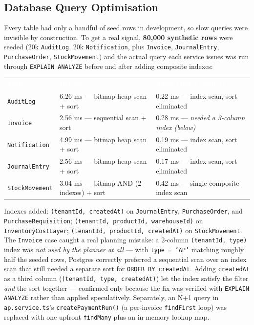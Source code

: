\documentclass[11pt,a4paper]{article}
\newcommand{\code}[1]{\texttt{\small #1}}
\begin{document}
\subsection{Database Query Optimisation}

Every table had only a handful of seed rows in development, so slow queries were
invisible by construction. To get a real signal, \textbf{80{,}000 synthetic rows} were
seeded (20k \code{AuditLog}, 20k \code{Notification}, plus \code{Invoice},
\code{JournalEntry}, \code{PurchaseOrder}, \code{StockMovement}) and the actual query
each service issues was run through \code{EXPLAIN ANALYZE} before and after adding
composite indexes:

\begin{table}[H]
\centering\small
\renewcommand{\arraystretch}{1.2}
\begin{tabularx}{\textwidth}{l X X}
\toprule
\rowcolor{amdoxnavy}
\textcolor{white}{\textbf{Table}} & \textcolor{white}{\textbf{Before}} & \textcolor{white}{\textbf{After (index added)}} \\
\code{AuditLog} & 6.26 ms --- bitmap heap scan + sort & 0.22 ms --- index scan, sort eliminated \\
\rowcolor{amdoxlight}
\code{Invoice} & 2.56 ms --- sequential scan + sort & 0.28 ms --- \emph{needed a 3-column index (below)} \\
\code{Notification} & 4.99 ms --- bitmap heap scan + sort & 0.19 ms --- index scan, sort eliminated \\
\rowcolor{amdoxlight}
\code{JournalEntry} & 2.56 ms --- bitmap heap scan + sort & 0.17 ms --- index scan, sort eliminated \\
\code{StockMovement} & 3.04 ms --- bitmap AND (2 indexes) + sort & 0.42 ms --- single composite index scan \\
\bottomrule
\end{tabularx}
\end{table}

Indexes added: \code{(tenantId, createdAt)} on \code{JournalEntry},
\code{PurchaseOrder}, and \code{PurchaseRequisition}; \code{(tenantId, productId,
warehouseId)} on \code{InventoryCostLayer}; \code{(tenantId, productId, createdAt)} on
\code{StockMovement}. The \code{Invoice} case caught a real planning mistake: a
2-column \code{(tenantId, type)} index was \emph{not used by the planner at all} ---
with \code{type = 'AP'} matching roughly half the seeded rows, Postgres correctly
preferred a sequential scan over an index scan that still needed a separate sort for
\code{ORDER BY createdAt}. Adding \code{createdAt} as a third column
(\code{(tenantId, type, createdAt)}) let the index satisfy the filter \emph{and} the
sort together --- confirmed only because the fix was verified with
\code{EXPLAIN ANALYZE} rather than applied speculatively. Separately, an N+1 query in
\code{ap.service.ts}'s \code{createPaymentRun()} (a per-invoice \code{findFirst} loop)
was replaced with one upfront \code{findMany} plus an in-memory lookup map.
\end{document}
